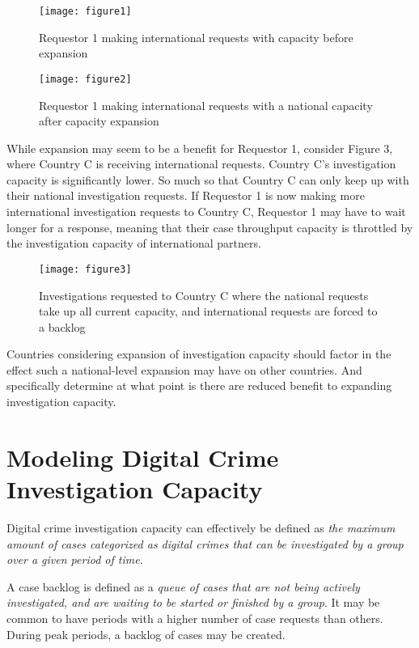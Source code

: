 \documentclass[10pt,a4paper]{article}
\begin{document}
\begin{figure}
  \centering
  \texttt{[image: figure1]}
  \caption{Requestor 1 making international requests with capacity before expansion}
\end{figure}

\begin{figure}
  \centering
  \texttt{[image: figure2]}
  \caption{Requestor 1 making international requests with a national capacity after capacity expansion}
\end{figure}

While expansion may seem to be a benefit for Requestor 1, consider Figure 3, where Country C is receiving international requests. Country C's investigation capacity is significantly lower. So much so that Country C can only keep up with their national investigation requests. If Requestor 1 is now making more international investigation requests to Country C, Requestor 1 may have to wait longer for a response, meaning that their case throughput capacity is throttled by the investigation capacity of international partners.

\begin{figure}
  \centering
  \texttt{[image: figure3]}
  \caption{Investigations requested to Country C where the national requests take up all current capacity, and international requests are forced to a backlog}
\end{figure}

Countries considering expansion of investigation capacity should factor in the effect such a national-level expansion may have on other countries. And specifically determine at what point is there are reduced benefit to expanding investigation capacity.

\section{Modeling Digital Crime Investigation Capacity}
Digital crime investigation capacity can effectively be defined as \textit{the maximum amount of cases categorized as digital crimes that can be investigated by a group over a given period of time}.

A case backlog is defined as a \textit{queue of cases that are not being actively investigated, and are waiting to be started or finished by a group}. It may be common to have periods with a higher number of case requests than others. During peak periods, a backlog of cases may be created.
\end{document}
